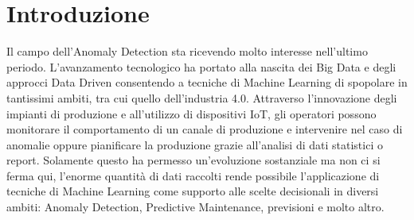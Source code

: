 \chapter{Introduzione}
\label{chap:first-chapter-intro}
Il campo dell'Anomaly Detection sta ricevendo molto interesse nell'ultimo periodo. L'avanzamento tecnologico ha portato alla nascita dei Big Data e degli approcci Data Driven consentendo a tecniche di Machine Learning di spopolare in tantissimi ambiti, tra cui quello dell'industria 4.0.
Attraverso l'innovazione degli impianti di produzione e all'utilizzo di dispositivi IoT, gli operatori possono monitorare il comportamento di un canale di produzione e intervenire nel caso di anomalie oppure pianificare la produzione grazie all'analisi di dati statistici o report.
Solamente questo ha permesso un'evoluzione sostanziale ma non ci si ferma qui, l'enorme quantità di dati raccolti rende possibile l'applicazione di tecniche di Machine Learning come supporto alle scelte decisionali in diversi ambiti: Anomaly Detection, Predictive Maintenance, previsioni e molto altro.

